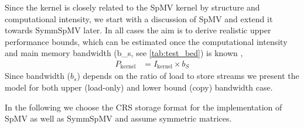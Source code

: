 
Since the kernel is closely related to the \acrshort{SpMV} kernel by structure and computational intensity, we start with a discussion of \acrshort{SpMV} and extend it towards \acrshort{SymmSpMV} later. In all cases the aim is to derive realistic upper performance bounds, which can be estimated once the computational intensity and main memory bandwidth (\acrshort{b_s}, see \cref{tab:test_bed}) is known \cite{Williams_roofline}, \ie
  \begin{align}
   	\label{eq:upper_performance}
   	P_\mathrm{kernel}  &= I_\mathrm{kernel}  \times b_S
  \end{align}
Since bandwidth ($b_s$) depends on the ratio of load to store streams we present the model for both upper (load-only) and lower bound (copy) bandwidth case.  
  
  In the following we choose the \acrshort{CRS} storage format for the  implementation of \acrshort{SpMV} as well as  \acrshort{SymmSpMV} and assume symmetric matrices.


